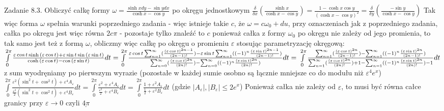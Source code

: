 \documentclass{article}
\begin{document}
Zadanie 8.3.
\newline
\newline
Obliczyć całkę formy $\omega=\frac{\sinh{x}dy-\sin{y}dx}{\cosh{x}-\cos{y}}$ po okręgu jednostkowym\newline
$
\frac{\delta}{\delta x}(\frac{\sinh{x}}{\cosh{x}-\cos{y}})
=
\frac{1-\cosh{x}\cos{y}}{(\cosh{x}-\cos{y})^2}=\frac{\delta}{\delta y}(\frac{-\sin{y}}{\cosh{x}-\cos{y}})
$
Tak więc forma $\omega$ spełnia warunki poprzedniego zadania - więc istnieje takie $c$, że $\omega=c\omega_0+du$, przy oznaczeniach jak z poprzedniego zadania,
całka po okregu jest więc równa $2c\pi$ - pozostaje tylko znaleźć to $c$\newline
ponieważ całka z formy $\omega_0$ po okręgu nie zależy od jego promienia, to tak samo jest też z formą $\omega$, obliczmy więc całkę po okręgu o promieniu $\varepsilon$
stosując parametryzację okręgową:\newline
$
\int\limits_{0}^{2\pi}\frac{\varepsilon\cos{t}\sinh{(\varepsilon\cos{t})}+\varepsilon\sin{t}\sin{(\varepsilon\sin{t})}}
{\cosh{(\varepsilon\cos{t})}-\cos{(\varepsilon\sin{t})}}dt
=
\int\limits_{0}^{2\pi}
\frac{\varepsilon\cos{t}\sum_{n=1}^{\infty}(\frac{(\varepsilon\cos{t})^{2n-1}}{(2n-1)!})-\varepsilon\sin{t}\sum_{n=1}^{\infty}((-1)^n\frac{(\varepsilon\sin{t})^{2n-1}}{(2n-1)!})}
{\sum_{n=0}^{\infty}(\frac{(\varepsilon\cos{t})^{2n}}{(2n)!})-\sum_{n=0}^{\infty}((-1)^n\frac{(\varepsilon\sin{t})^{2n}}{(2n)!})}dt
=\newline
\int\limits_{0}^{2\pi}
\frac{\sum_{n=1}^{\infty}(\frac{(\varepsilon\cos{t})^{2n}}{(2n-1)!})-\sum_{n=1}^{\infty}((-1)^n\frac{(\varepsilon\sin{t})^{2n}}{(2n-1)!})}
{\sum_{n=1}^{\infty}(\frac{(\varepsilon\cos{t})^{2n}}{(2n)!})+1-\sum_{n=1}^{\infty}((-1)^n\frac{(\varepsilon\sin{t})^{2n}}{(2n)!})-1}dt
$\quad
z sum wyodręniamy po pierwszym wyrazie (pozostałe w każdej sumie  osobno są łącznie mniejsze co do modułu niż $\varepsilon^4e^x$)
$
\int\limits_{0}^{2\pi}\frac{\varepsilon^2(\sin^2{t}+\cos^2{t})+\varepsilon^4A_{\varepsilon}}{\frac{\varepsilon^2}{2}(\sin^2{t}+\cos^2{t})+\varepsilon^4B_{\varepsilon}}dt
=
\int\limits_{0}^{2\pi}\frac{\varepsilon^2+\varepsilon^4A_{\varepsilon}}{\frac{\varepsilon^2}{2}+\varepsilon^4B_{\varepsilon}}dt
=
\int\limits_{0}^{2\pi}\frac{1+\varepsilon^2A_{\varepsilon}}{\frac{1}{2}+\varepsilon^2B_{\varepsilon}}dt
$\newline
(gdzie $|A_{\varepsilon}|,|B_{\varepsilon}|\le2e^x$)
Ponieważ całka nie zależy od $\varepsilon$, to musi być równa całce granicy przy $\varepsilon\rightarrow 0$ czyli $\underline{4\pi}$
\newpage
\end{document}
